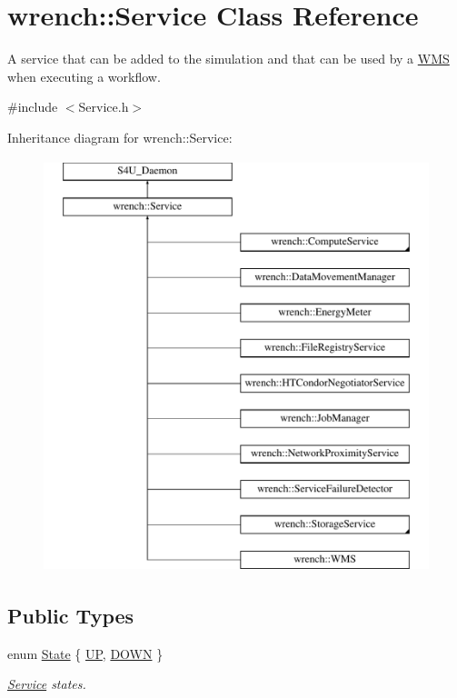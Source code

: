 \hypertarget{classwrench_1_1_service}{}\section{wrench\+:\+:Service Class Reference}
\label{classwrench_1_1_service}


A service that can be added to the simulation and that can be used by a \hyperlink{classwrench_1_1_w_m_s}{W\+MS} when executing a workflow.  




{\ttfamily \#include $<$Service.\+h$>$}

Inheritance diagram for wrench\+:\+:Service\+:\begin{figure}[H]
\begin{center}
\leavevmode
\includegraphics[height=12.000000cm]{classwrench_1_1_service}
\end{center}
\end{figure}
\subsection*{Public Types}
\begin{DoxyCompactItemize}
\item 
enum \hyperlink{classwrench_1_1_service_a6f4e098718aa5d6f637c694de779e5c7}{State} \{ \hyperlink{classwrench_1_1_service_a6f4e098718aa5d6f637c694de779e5c7a4cd8bb98696ee5c7fb020b43af5b862e}{UP}, 
\hyperlink{classwrench_1_1_service_a6f4e098718aa5d6f637c694de779e5c7aa292425b049c40e72735a392958990c3}{D\+O\+WN}
 \}\begin{DoxyCompactList}\small\item\em \hyperlink{classwrench_1_1_service}{Service} states. \end{DoxyCompactList}
\end{DoxyCompactItemize}
